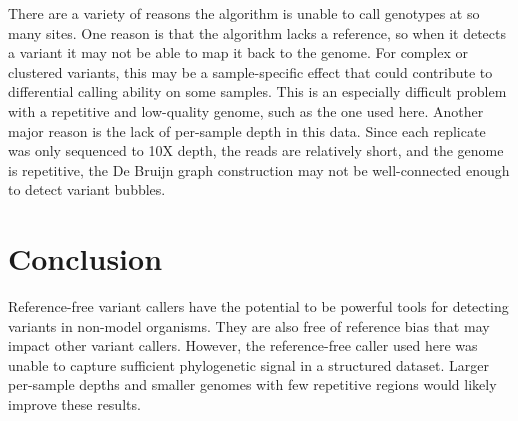 There are a variety of reasons the algorithm is unable to call genotypes at so many sites. One reason is that the algorithm lacks a reference, so when it detects a variant it may not be able to map it back to the genome. For complex or clustered variants, this may be a sample-specific effect that could contribute to differential calling ability on some samples. This is an especially difficult problem with a repetitive and low-quality genome, such as the one used here. Another major reason is the lack of per-sample depth in this data. Since each replicate was only sequenced to 10X depth, the reads are relatively short, and the genome is repetitive, the De Bruijn graph construction may not be well-connected enough to detect variant bubbles.

\section{Conclusion}

Reference-free variant callers have the potential to be powerful tools for detecting variants in non-model organisms. They are also free of reference bias that may impact other variant callers. However, the reference-free caller used here was unable to capture sufficient phylogenetic signal in a structured dataset. Larger per-sample depths and smaller genomes with few repetitive regions would likely improve these results.

\clearpage

\printbibliography[segment=\therefsegment]{}
